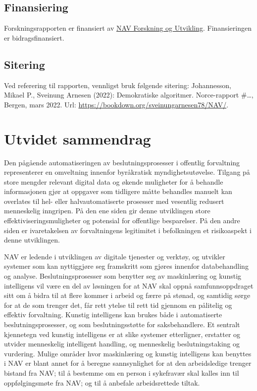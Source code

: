 \documentclass[
]{book}
\begin{document}
\hypertarget{finansiering}{%
\section{Finansiering}\label{finansiering}}

Forskningsrapporten er finansiert av \href{https://www.nav.no/no/nav-og-samfunn/kunnskap/fou-midler/pagaende-fou-prosjekter2/navs-tiltak-og-virkemidler}{NAV Forskning og Utvikling}.
Finansieringen er bidragsfinansiert.

\hypertarget{sitering}{%
\section{Sitering}\label{sitering}}

Ved referering til rapporten, vennligst bruk følgende sitering:
Johannesson, Mikael P., Sveinung Arnesen (2022): Demokratiske algoritmer. Norce-rapport \#\ldots, Bergen, mars 2022. Url: \url{https://bookdown.org/sveinungarnesen78/NAV/}.

\hypertarget{sammendrag}{%
\chapter{Utvidet sammendrag}\label{sammendrag}}

Den pågående automatiseringen av beslutningsprosesser i offentlig forvaltning representerer en omveltning innenfor byråkratisk myndighetsutøvelse.
Tilgang på store mengder relevant digital data og økende muligheter for å behandle informasjonen gjør at oppgaver som tidligere måtte behandles manuelt kan overlates til hel- eller halvautomatiserte prosesser med vesentlig redusert menneskelig inngripen.
På den ene siden gir denne utviklingen store effektiviseringsmuligheter og potensial for offentlige besparelser.
På den andre siden er ivaretakelsen av forvaltningens legitimitet i befolkningen et risikoaspekt i denne utviklingen.

NAV er ledende i utviklingen av digitale tjenester og verktøy, og utvikler systemer som kan nyttiggjøre seg framskritt som gjøres innenfor databehandling og analyse.
Beslutningsprosesser som benytter seg av maskinlæring og kunstig intelligens vil være en del av løsningen for at NAV skal oppnå samfunnsoppdraget sitt om å bidra til at flere kommer i arbeid og færre på stønad, og samtidig sørge for at de som trenger det, får rett ytelse til rett tid gjennom en pålitelig og effektiv forvaltning.
Kunstig intelligens kan brukes både i automatiserte beslutningsprosesser, og som beslutningsstøtte for saksbehandlere.
Et sentralt kjennetegn ved kunstig intelligens er at slike systemer etterligner, erstatter og utvider menneskelig intelligent handling, og menneskelig beslutningstaking og vurdering.
Mulige områder hvor maskinlæring og kunstig intelligens kan benyttes i NAV er blant annet for å beregne sannsynlighet for at den arbeidsledige trenger bistand fra NAV; til å bestemme om en person i sykefravær skal kalles inn til oppfølgingsmøte fra NAV; og til å anbefale arbeidsrettede tiltak.
\end{document}
